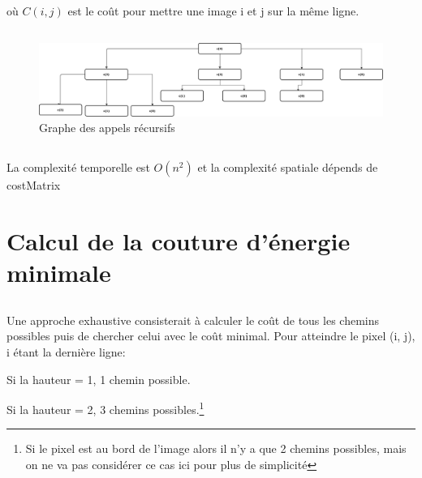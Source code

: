 \subsection{} %
	
	où $C(i,j)$ est le coût pour mettre 	une image i et j sur la même ligne. 
	
\subsection{} %

\begin{figure}[H]
	\centering
	\includegraphics[width=1\linewidth]{diagram.pdf}
	\caption{Graphe des appels récursifs}
	\label{cost}
\end{figure}

\subsection{} %



\subsection{} %
	La complexité temporelle est $O(n^2)$ et la complexité spatiale dépends de costMatrix

\setcounter{section}{0}

\section{Calcul de la couture d'énergie minimale} %
\subsection{} %
Une approche exhaustive consisterait à calculer le coût de tous les chemins possibles puis de chercher celui avec le coût minimal.
Pour atteindre le pixel (i, j), i étant la dernière ligne:

Si la hauteur = 1, 1 chemin possible.

Si la hauteur = 2, 3 chemins possibles.\footnote{Si le pixel est au bord de l'image alors il n'y a que 2 chemins possibles, mais on ne va pas considérer ce cas ici pour plus de simplicité}

